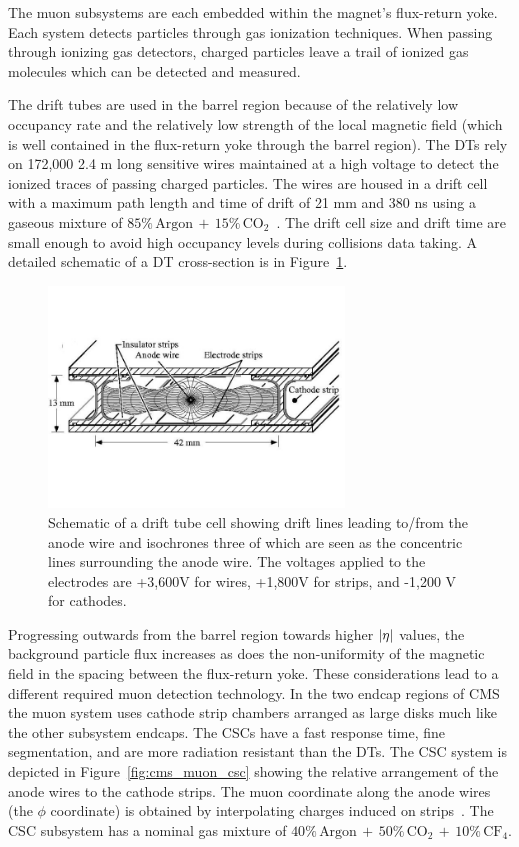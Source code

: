 The muon subsystems are each embedded within the magnet's flux-return yoke. Each system
detects particles through gas ionization techniques. 
When passing through ionizing gas detectors, charged particles leave a trail of ionized gas 
molecules which can be detected and measured.

The drift tubes are used in the barrel region
because of the relatively low occupancy rate and the relatively low strength of the local
magnetic field (which is well contained in the flux-return yoke through the barrel region).
The DTs rely on 172,000 2.4 m long sensitive wires maintained at a high voltage to detect the ionized traces
of passing charged particles. The wires are housed in a drift cell with a maximum path length
and time of drift of 21 mm and 380 ns using a gaseous mixture of 
$85\% \, \textrm{Argon} \, + \, 15\% \, \textrm{CO}_{2}$~\cite{CMS-Proposal}. The drift cell size and drift
time are small enough to avoid high occupancy levels during collisions data taking.
A detailed schematic of a DT cross-section is in Figure~\ref{fig:cms_muon_dt}.

\begin{figure}[htbp]
\centering
     \includegraphics[width=0.7\textwidth]{cms_and_lhc/plots/cms_muon_dt.jpg}
     \caption{
Schematic of a drift tube cell showing drift lines leading to/from the anode wire 
and isochrones three of which are seen as the concentric lines surrounding the 
anode wire. The voltages applied to the 
electrodes are +3,600V for wires, +1,800V for strips, and -1,200 V for cathodes.
     }
     \label{fig:cms_muon_dt}
\end{figure}

Progressing outwards from the barrel region towards higher $\lvert\eta\rvert$ values, the background 
particle flux increases as does the non-uniformity of the magnetic field in the spacing between
the flux-return yoke. These considerations lead to a different required muon detection technology.
In the two endcap regions of CMS the muon system uses cathode strip chambers arranged as large
disks much like the other subsystem endcaps. The CSCs have a fast 
response time, fine segmentation, and are more radiation resistant than the DTs. The CSC system
is depicted in Figure~\ref{fig:cms_muon_csc} showing the relative arrangement of the anode
wires to the cathode strips. The muon coordinate along the anode wires (the $\phi$ coordinate) 
is obtained by interpolating charges induced on strips~\cite{cms_csc_gas}.
The CSC subsystem has a nominal gas mixture of 
$40\% \, \textrm{Argon} \, + \, 50\% \, \textrm{CO}_{2} \, + \, 10\% \, \textrm{CF}_{4}$.


